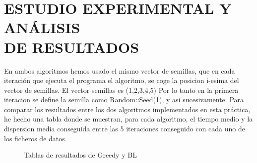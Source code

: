 \documentclass{article}
\begin{document}
\newpage

\newpage
\section{\large ESTUDIO EXPERIMENTAL Y ANÁLISIS \\DE RESULTADOS}
En ambos algoritmos hemos usado el mismo vector de semillas, que en cada iteración
que ejecuta el programa el algoritmo, se coge la posicion i-esima del vector de semillas.
\newline El vector semillas es (1,2,3,4,5)
Por lo tanto en la primera iteracion se define la semilla como Random::Seed(1), y asi
sucesivamente.
\newline Para comparar los resultados entre los dos algoritmos implementados en esta práctica, he hecho
una tabla donde se muestran, para cada algoritmo, el tiempo medio y la dispersion media conseguida entre
las 5 iteraciones conseguido con cada uno de los ficheros de datos.

\vspace{10mm}
\begin{figure}[h]
	\centering
	\caption{Tablas de resultados de Greedy y BL}
\end{figure}
\end{document}
